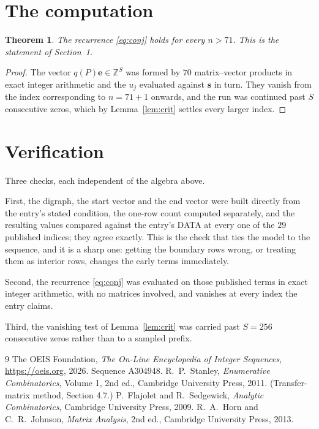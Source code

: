 \documentclass[11pt,a4paper]{article}
\theoremstyle{plain}
\newtheorem{theorem}{Theorem}
\theoremstyle{definition}
\begin{document}
\section{The computation}

\begin{theorem}
The recurrence \eqref{eq:conj} holds for every $n>71$. This is the statement of
Section~1.
\end{theorem}

\begin{proof}
The vector $q(P)\mathbf{e}\in\mathbb{Z}^{S}$ was formed by $70$ matrix--vector
products in exact integer arithmetic and the $u_j$ evaluated against $\mathbf{s}$ in turn.
They vanish from the index corresponding to $n=71+1$ onwards, and the run was continued
past $S$ consecutive zeros, which by Lemma~\ref{lem:crit} settles every larger index.
\end{proof}

\section{Verification}

Three checks, each independent of the algebra above.

First, the digraph, the start vector and the end vector were built directly from the
entry's stated condition, the one-row count computed separately, and the resulting values
compared against the entry's DATA at every one of the $29$ published indices; they
agree exactly. This is the check that ties the model to the sequence, and it is a sharp one:
getting the boundary rows wrong, or treating them as interior rows, changes the early terms
immediately.

Second, the recurrence \eqref{eq:conj} was evaluated on those published terms in exact
integer arithmetic, with no matrices involved, and vanishes at every index the entry claims.

Third, the vanishing test of Lemma~\ref{lem:crit} was carried past $S=256$ consecutive
zeros rather than to a sampled prefix.

\begin{thebibliography}{9}
 The OEIS Foundation, \emph{The On-Line Encyclopedia of Integer
Sequences}, \url{https://oeis.org}, 2026. Sequence A304948.
 R.~P.~Stanley, \emph{Enumerative Combinatorics}, Volume 1, 2nd ed.,
Cambridge University Press, 2011. (Transfer-matrix method, Section 4.7.)
 P.~Flajolet and R.~Sedgewick, \emph{Analytic Combinatorics}, Cambridge
University Press, 2009.
 R.~A.~Horn and C.~R.~Johnson, \emph{Matrix Analysis}, 2nd ed., Cambridge
University Press, 2013.
\end{thebibliography}
\end{document}
